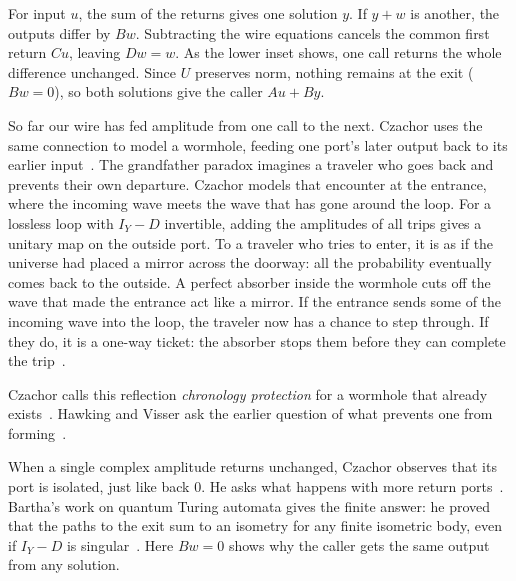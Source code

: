 \documentclass[acmsmall,screen,review,anonymous,nonacm]{acmart}
\newcommand{\storyinlineface}{\small\ttfamily}
\newcommand{\code}[1]{\textnormal{\storyinlineface #1}}
\numberwithin{equation}{section}
\begin{document}
\begin{figure}\centering
{}
\end{figure}
For input $u$, the sum of the returns gives one solution $y$. If
$y+w$ is another, the outputs differ by $Bw$. Subtracting the wire
equations cancels the common first return $Cu$, leaving $Dw=w$.
As the lower inset shows, one call returns the whole difference unchanged.
Since $U$ preserves norm, nothing remains at the exit ($Bw=0$),
so both solutions give the caller $Au+By$.

So far our wire has fed amplitude from one call to the next. Czachor
uses the same connection to model a wormhole, feeding one port's later
output back to its earlier input~\cite[Eqs.~(6)--(7)]{Czachor19Ring}.
The grandfather paradox imagines a traveler who goes back and prevents
their own departure. Czachor models that encounter at the entrance, where the incoming wave meets the
wave that has gone around the loop. For a lossless loop with $I_Y-D$
invertible, adding the amplitudes of all trips gives a unitary map on the outside port. To a
traveler who tries to enter, it is as if the universe had placed a
mirror across the doorway: all the probability eventually comes back to the outside. A
perfect absorber inside the wormhole cuts off the wave that made
the entrance act like a mirror. If the entrance sends some of the incoming wave into the loop,
the traveler now has a chance to step through. If they do, it is
a one-way ticket: the absorber stops them before they can complete the trip~\cite[Thm.~1 and
\S~IV]{Czachor19Ring}.

Czachor calls this reflection \emph{chronology protection} for a wormhole that already exists~\cite[\S~I]{Czachor19Ring}. Hawking and Visser ask the earlier question of what prevents one from forming~\cite{Hawking92Chronology,Visser93Chronology}.

When a single complex amplitude returns unchanged, Czachor observes
that its port is isolated, just like \code{back 0}. He asks what happens
with more return ports~\cite[arXiv v8, after Eq.~(45)]{Czachor19Ring}.
Bartha's work on quantum Turing automata gives the finite answer:
he proved that the paths to the exit sum to an isometry for any finite
isometric body, even if $I_Y-D$ is singular~\cite[Eq.~(1), Thm.~8]{Bartha14QuantumTuringAutomata}.
Here $Bw=0$ shows why the caller gets the same output from any solution.
\end{document}
